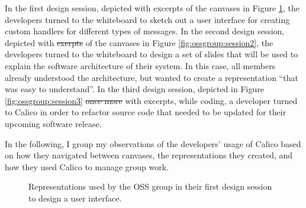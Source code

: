 \documentclass[12pt,fleqn]{ucithesis}
\providecommand{\DIFaddtex}[1]{{\protect\color{blue}\uwave{#1}}} %
\providecommand{\DIFdeltex}[1]{{\protect\color{red}\sout{#1}}}                      %
\providecommand{\DIFaddbegin}{} %
\providecommand{\DIFaddend}{} %
\providecommand{\DIFdelbegin}{} %
\providecommand{\DIFdelend}{} %
\providecommand{\DIFadd}[1]{\texorpdfstring{\DIFaddtex{#1}}{#1}} %
\providecommand{\DIFdel}[1]{\texorpdfstring{\DIFdeltex{#1}}{}} %
\begin{document}
In the first design session, depicted with excerpts of the canvases in Figure \ref{fig:ossgroup:session1}, the developers turned to the whiteboard to sketch out a user interface for creating custom handlers for different types of messages. In the second design session, depicted with \DIFdelbegin \DIFdel{exerpts }\DIFdelend \DIFaddbegin \DIFadd{excerpts }\DIFaddend of the canvases in Figure \ref{fig:ossgroup:session2}, the developers turned to the whiteboard to design a set of slides that will be used to explain the software architecture of their system. In this case, all members already understood the architecture, but wanted to create a representation ``that was easy to understand''. In the third design session, depicted in Figure \ref{fig:ossgroup:session3} \DIFdelbegin \DIFdel{once more }\DIFdelend with excerpts, while coding, a developer turned to Calico in order to refactor source code that needed to be updated for their upcoming software release.

In the following, I group my observations of the developers' usage of Calico based on how they navigated between canvases, the representations they created, and how they used Calico to manage group work.

\begin{figure}%
  \centering
   \caption {Representations used by the OSS group in their first design session to design a user interface.}
   \label{fig:ossgroup:session1}
\end{figure}%
\end{document}
